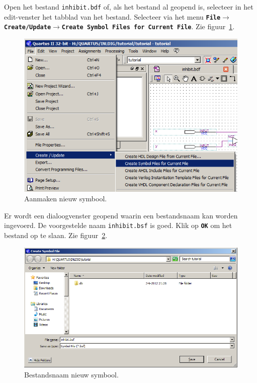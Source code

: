 \documentclass[a4paper,12pt,fleqn,twoside]{book}
\def\tutpicscale{0.455}
\newcommand{\menu}[1]{\texttt{\textbf{#1}}}
\newcommand{\knop}[1]{\texttt{\textbf{#1}}}
\newcommand{\naam}[1]{\texttt{#1}}
\def\pijl{$\rightarrow$}%
\begin{document}
Open het bestand \lstinline|inhibit.bdf| of, als het bestand al geopend is,
selecteer in het edit-venster het tabblad van het bestand. Selecteer via het
menu \menu{File\pijl{}Create/Update\pijl{}Create Symbol Files for Current File}.
Zie figuur~\ref{fig:033createsymbolfiles}.

\begin{figure}[H]
\centering
\includegraphics[scale=\tutpicscale]{033createsymbolfiles}
\caption{Aanmaken nieuw symbool.}
\label{fig:033createsymbolfiles}
\end{figure}

Er wordt een dialoogvenster geopend waarin een bestandsnaam kan worden
ingevoerd. De voorgestelde naam \naam{inhibit.bsf} is goed. Klik op \knop{OK}
om het bestand op te slaan. Zie figuur~\ref{fig:034savefileas}.

\begin{figure}[H]
\centering
\includegraphics[scale=\tutpicscale]{034savefileas}
\caption{Bestandsnaam nieuw symbool.}
\label{fig:034savefileas}
\end{figure}
\end{document}
